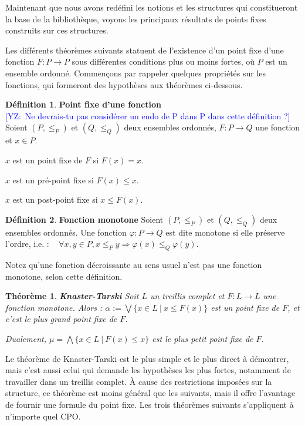 \documentclass{article}
\newcommand{\yz}[1]{\textcolor{blue}{{[YZ:~#1]}}}
\newtheorem{theorem}{Théorème}[section]
\theoremstyle{definition}
\newtheorem{definition}{Définition}[section]
\begin{document}
Maintenant que nous avons redéfini les notions et les structures qui constitueront la base de la bibliothèque, voyons les principaux résultats de points fixes construits sur ces structures.

Les différents théorèmes suivants statuent de l'existence d'un point fixe d'une fonction $F : P \rightarrow P$ sous différentes conditions plus ou moins fortes, où $P$ est un ensemble ordonné. Commençons par rappeler quelques propriétés sur les fonctions, qui formeront des hypothèses aux théorèmes ci-dessous.

\begin{definition}{\textbf{Point fixe d'une fonction\\}}
  \yz{Ne devrais-tu pas considérer un endo de P dans P dans cette définition ?}
Soient $(P, \leq_P)$ et $(Q, \leq_Q)$ deux ensembles ordonnés, $F : P \rightarrow Q$ une fonction et $x \in P$. 

$x$ est un point fixe de $F$ si $F(x) = x$.

$x$ est un pré-point fixe si $F(x) \leq x$.

$x$ est un post-point fixe si $x \leq F(x)$.
\end{definition}

\begin{definition}{\textbf{Fonction monotone}}
Soient $(P, \leq_P)$ et $(Q, \leq_Q)$ deux ensembles ordonnés. Une fonction $\varphi : P \rightarrow Q$ est dite monotone si elle préserve l'ordre, i.e. : ~ $\forall x, y \in P, x \leq_P y \Longrightarrow \varphi(x) \leq_Q \varphi(y)$.

Notez qu'une fonction décroissante au sens usuel n'est pas une fonction monotone, selon cette définition.
\end{definition}

\begin{theorem}{\textbf{Knaster-Tarski}}
Soit $L$ un treillis complet et $F : L \rightarrow L$ une fonction monotone. Alors :
$ \alpha := \bigvee \{x \in L ~|~ x \leq F(x)\}$
est un point fixe de $F$, et c'est le plus grand point fixe de $F$.

\noindent Dualement, $\mu = \bigwedge \{x \in L ~|~ F(x) \leq x\}$ est le plus petit point fixe de $F$.
\end{theorem}

Le théorème de Knaster-Tarski est le plus simple et le plus direct à démontrer, mais c'est aussi celui qui demande les hypothèses les plus fortes, notamment de travailler dans un treillis complet. À cause des restrictions imposées sur la structure, ce théorème est moins général que les suivants, mais il offre l'avantage de fournir une formule du point fixe. Les trois théorèmes suivants s'appliquent à n'importe quel CPO.
\end{document}
